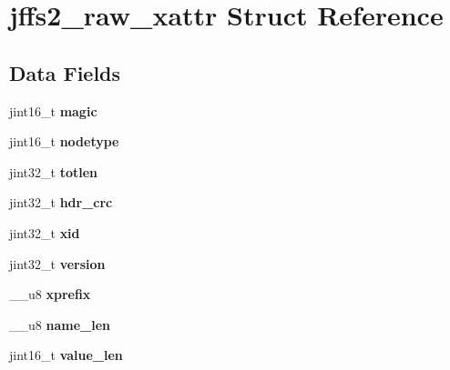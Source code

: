 \hypertarget{structjffs2__raw__xattr}{}\section{jffs2\+\_\+raw\+\_\+xattr Struct Reference}
\label{structjffs2__raw__xattr}
\subsection*{Data Fields}
\begin{DoxyCompactItemize}
\item 
\mbox{\label{structjffs2__raw__xattr_a9621ea9e41064851bfed2486ca00bd12}} 
jint16\+\_\+t {\bfseries magic}
\item 
\mbox{\label{structjffs2__raw__xattr_a0766592be1867dec3a244d1f918868fe}} 
jint16\+\_\+t {\bfseries nodetype}
\item 
\mbox{\label{structjffs2__raw__xattr_aac6e966fc72b4ca5f9198808c16d2406}} 
jint32\+\_\+t {\bfseries totlen}
\item 
\mbox{\label{structjffs2__raw__xattr_a54960f17578874919ca738933e4509da}} 
jint32\+\_\+t {\bfseries hdr\+\_\+crc}
\item 
\mbox{\label{structjffs2__raw__xattr_ae1659aa7482219daf75ccf4e234568b9}} 
jint32\+\_\+t {\bfseries xid}
\item 
\mbox{\label{structjffs2__raw__xattr_aaf194f05cc7457f3269443983731eb2e}} 
jint32\+\_\+t {\bfseries version}
\item 
\mbox{\label{structjffs2__raw__xattr_a65f11e84eab705d0814b8bb0c5293280}} 
\+\_\+\+\_\+u8 {\bfseries xprefix}
\item 
\mbox{\label{structjffs2__raw__xattr_a33f95ad1f88c56554d21712a17a48f3c}} 
\+\_\+\+\_\+u8 {\bfseries name\+\_\+len}
\item 
\mbox{\label{structjffs2__raw__xattr_a4135e226a6ad1753cf4b1da7ca2e2d62}} 
jint16\+\_\+t {\bfseries value\+\_\+len}

\end{DoxyCompactItemize}
